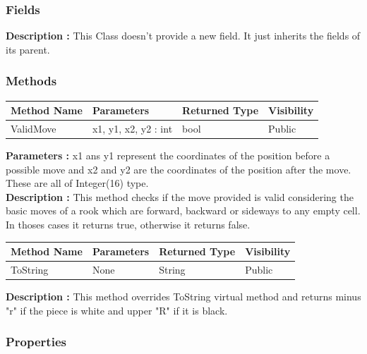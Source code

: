 \documentclass[12pt]{article}
\begin{document}
\subsubsection{Fields}

\textbf{Description :} This Class doesn't provide a new field. It just
inherits the fields of its parent.

\subsubsection{Methods}

\begin{table}[H]
    \begin{tabular}{|l|l|l|l|}
    \hline
    \rowcolor[HTML]{EFEFEF} 
    \cellcolor[HTML]{EFEFEF}\textbf{Method Name} & \textbf{Parameters}  & \textbf{Returned Type} & \textbf{Visibility} \\ \hline
    ValidMove                          & x1, y1, x2, y2 : int & bool                   & Public              \\ \hline
    \end{tabular}
\end{table}

\textbf{Parameters :} x1 ans y1 represent the coordinates of the position before a possible move
and x2 and y2 are the coordinates of the position after the move. These are all of Integer(16) type.
\\
\textbf{Description :} This method checks if the move provided is
valid considering the basic moves of a rook which are forward,
backward or sideways to any empty cell. In thoses cases it returns
true, otherwise it returns false. 

\begin{table}[H]
    \begin{tabular}{|l|l|l|l|}
    \hline
    \rowcolor[HTML]{EFEFEF} 
    \cellcolor[HTML]{EFEFEF}\textbf{Method Name} & \textbf{Parameters}  & \textbf{Returned Type} & \textbf{Visibility} \\ \hline
    ToString                                   & None                 & String                   & Public              \\ \hline
    \end{tabular}
\end{table}

\textbf{Description :} This method overrides ToString virtual
method and returns minus "r" if the piece is white and upper "R"
if it is black.

\subsubsection{Properties}
\end{document}
